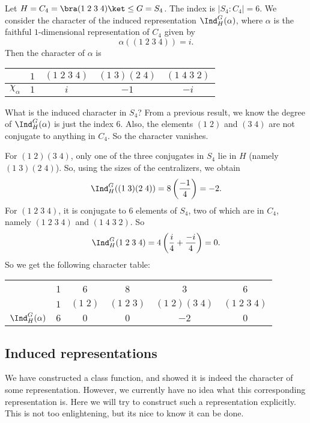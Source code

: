 \documentclass[a4paper]{article}
\begin{document}
\begin{eg}
  Let $H = C_4 = \bra (1\; 2\; 3\; 4)\ket \leq G = S_4$. The index is $|S_4: C_4| = 6$. We consider the character of the induced representation $\Ind_H^G (\alpha)$, where $\alpha$ is the faithful $1$-dimensional representation of $C_4$ given by
  \[
    \alpha((1\; 2\; 3\; 4)) = i.
  \]
  Then the character of $\alpha$ is
  \begin{center}
    \begin{tabular}{ccccc}
      \toprule
      & $1$ & $(1\; 2\; 3\; 4)$ & $(1\; 3)(2\; 4)$ & $(1\; 4\; 3\; 2)$\\
      \midrule
      $\chi_\alpha$ & $1$ & $i$ & $-1$ & $-i$\\
      \bottomrule
    \end{tabular}
  \end{center}
  What is the induced character in $S_4$? From a previous result, we know the degree of $\Ind_H^G(\alpha)$ is just the index $6$. Also, the elements $(1\; 2)$ and $(3\; 4)$ are not conjugate to anything in $C_4$. So the character vanishes.

  For $(1\; 2)(3\; 4)$, only one of the three conjugates in $S_4$ lie in $H$ (namely $(1\; 3)(2\; 4)$). So, using the sizes of the centralizers, we obtain
  \[
    \Ind_H^G((1\; 3)(2\; 4)) = 8 \left(\frac{-1}{4}\right) = -2.
  \]
  For $(1\; 2\; 3\; 4)$, it is conjugate to $6$ elements of $S_4$, two of which are in $C_4$, namely $(1\; 2\; 3\; 4)$ and $(1\; 4\; 3\; 2)$. So
  \[
    \Ind_H^G(1\; 2\; 3\; 4) = 4 \left(\frac{i}{4} + \frac{-i}{4}\right) = 0.
  \]
  So we get the following character table:
  \begin{center}
    \begin{tabular}{cccccc}
      \toprule
      & 1 & 6 & 8 & 3 & 6\\
      & $1$ & $(1\; 2)$ & $(1\; 2\; 3)$ & $(1\; 2)(3\; 4)$ & $(1\; 2\; 3\; 4)$\\
      \midrule
      $\Ind_H^G(\alpha)$ & $6$ & $0$ & $0$ & $-2$ & $0$\\
      \bottomrule
    \end{tabular}
  \end{center}
\end{eg}
\subsection{Induced representations}
We have constructed a class function, and showed it is indeed the character of some representation. However, we currently have no idea what this corresponding representation is. Here we will try to construct such a representation explicitly. This is not too enlightening, but its nice to know it can be done.
\end{document}
